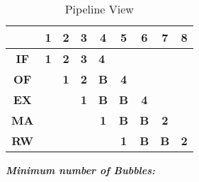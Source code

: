 \documentclass[12pt]{article}
\begin{document}
\begin{table}[]
    \begin{center}
\begin{tabular}{|c|cccc|ccll}
\hline
\multicolumn{1}{|l|}{} & \multicolumn{1}{c|}{1}          & \multicolumn{1}{c|}{\textbf{2}} & \multicolumn{1}{c|}{\textbf{3}} & \textbf{4}                      & \multicolumn{1}{c|}{\textbf{5}} & \multicolumn{1}{c|}{\textbf{6}} & \multicolumn{1}{c|}{\textbf{7}} & \multicolumn{1}{c|}{\textbf{8}} \\ \hline
\textbf{IF}            & \multicolumn{1}{c|}{\textbf{1}} & \multicolumn{1}{c|}{\textbf{2}} & \multicolumn{1}{c|}{\textbf{3}} & \multicolumn{1}{l|}{\textbf{4}} & \multicolumn{1}{l}{}            & \multicolumn{1}{l}{}            &                                 &                                 \\ \cline{1-6}
\textbf{OF}            & \multicolumn{1}{c|}{}           & \multicolumn{1}{c|}{\textbf{1}} & \multicolumn{1}{c|}{\textbf{2}} & \textbf{B}                      & \multicolumn{1}{c|}{\textbf{4}} & \textbf{}                       &                                 &                                 \\ \cline{1-1} \cline{3-7}
\textbf{EX}            &                                 & \multicolumn{1}{c|}{}           & \multicolumn{1}{c|}{\textbf{1}} & \textbf{B}                      & \multicolumn{1}{c|}{\textbf{B}} & \multicolumn{1}{c|}{\textbf{4}} &                                 &                                 \\ \cline{1-1} \cline{4-8}
\textbf{MA}            &                                 &                                 & \multicolumn{1}{c|}{}           & \textbf{1}                      & \multicolumn{1}{c|}{\textbf{B}} & \multicolumn{1}{c|}{\textbf{B}} & \multicolumn{1}{c|}{\textbf{2}} &                                 \\ \cline{1-1} \cline{5-9} 
\textbf{RW}            &                                 &                                 &                                 & \multicolumn{1}{l|}{}           & \multicolumn{1}{c|}{\textbf{1}} & \multicolumn{1}{c|}{\textbf{B}} & \multicolumn{1}{l|}{\textbf{B}} & \multicolumn{1}{c|}{\textbf{2}} \\ \cline{1-1} \cline{6-9} 
\end{tabular}
    \end{center}
    \caption{Pipeline View}
\end{table}

\textbf{\textit{Minimum number of Bubbles:}} \\
\end{document}
